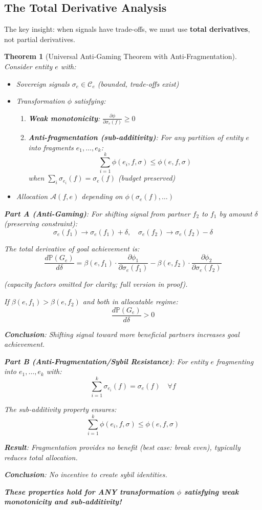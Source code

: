 \documentclass[11pt,a4paper]{article}
\newtheorem{theorem}{Theorem}[section]
\theoremstyle{definition}
\theoremstyle{remark}
\newcommand{\A}{\mathcal{A}}
\newcommand{\C}{\mathcal{C}}
\begin{document}
\subsection{The Total Derivative Analysis}

The key insight: when signals have trade-offs, we must use \textbf{total derivatives}, not partial derivatives.

\begin{theorem}[Universal Anti-Gaming Theorem with Anti-Fragmentation]
\label{thm:anti-gaming}
Consider entity $e$ with:
\begin{itemize}
\item Sovereign signals $\sigma_e \in \C_e$ (bounded, trade-offs exist)
\item Transformation $\phi$ satisfying:
  \begin{enumerate}
  \item \textbf{Weak monotonicity}: $\frac{\partial \phi}{\partial \sigma_e(f)} \ge 0$
  \item \textbf{Anti-fragmentation (sub-additivity)}: For any partition of entity $e$ into fragments $e_1, \ldots, e_k$:
  \[ \sum_{i=1}^k \phi(e_i, f, \sigma) \le \phi(e, f, \sigma) \]
  when $\sum_i \sigma_{e_i}(f) = \sigma_e(f)$ (budget preserved)
  \end{enumerate}
\item Allocation $\A(f,e)$ depending on $\phi(\sigma_e(f), \ldots)$
\end{itemize}

\textbf{Part A (Anti-Gaming)}: For shifting signal from partner $f_2$ to $f_1$ by amount $\delta$ (preserving constraint):
\[ \sigma_e(f_1) \to \sigma_e(f_1) + \delta, \quad \sigma_e(f_2) \to \sigma_e(f_2) - \delta \]

The total derivative of goal achievement is:
\[ \frac{d\mathbb{P}(G_e)}{d\delta} = \beta(e,f_1) \cdot \frac{\partial \phi_1}{\partial \sigma_e(f_1)} - \beta(e,f_2) \cdot \frac{\partial \phi_2}{\partial \sigma_e(f_2)} \]

(capacity factors omitted for clarity; full version in proof).

If $\beta(e,f_1) > \beta(e,f_2)$ and both in allocatable regime:
\[ \frac{d\mathbb{P}(G_e)}{d\delta} > 0 \]

\textbf{Conclusion}: Shifting signal toward more beneficial partners increases goal achievement.

\textbf{Part B (Anti-Fragmentation/Sybil Resistance)}: For entity $e$ fragmenting into $e_1, \ldots, e_k$ with:
\[ \sum_{i=1}^k \sigma_{e_i}(f) = \sigma_e(f) \quad \forall f \]

The sub-additivity property ensures:
\[ \sum_{i=1}^k \phi(e_i, f, \sigma) \le \phi(e, f, \sigma) \]

\textbf{Result}: Fragmentation provides no benefit (best case: break even), typically reduces total allocation.

\textbf{Conclusion}: No incentive to create sybil identities.

\medskip

\textbf{These properties hold for ANY transformation $\phi$ satisfying weak monotonicity and sub-additivity!}
\end{theorem}
\end{document}
